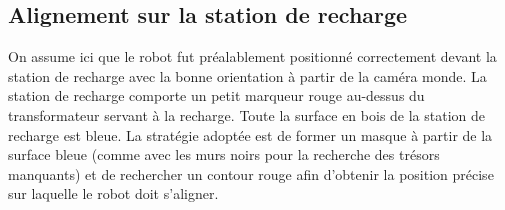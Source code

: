 \subsection{Alignement sur la station de recharge}

On assume ici que le robot fut préalablement positionné correctement devant la station de recharge avec la bonne orientation à partir de la caméra monde. La station de recharge comporte un petit marqueur rouge au-dessus du transformateur servant à la recharge. Toute la surface en bois de la station de recharge est bleue. La stratégie adoptée est de former un masque à partir de la surface bleue (comme avec les murs noirs pour la recherche des trésors manquants) et de rechercher un contour rouge afin d'obtenir la position précise sur laquelle le robot doit s'aligner.
